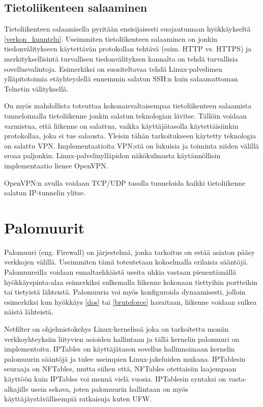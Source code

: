 \subsection{Tietoliikenteen salaaminen}\label{tietoliikenteen_salaaminen}

Tietoliikenteen salaamisella pyritään ensisijaisesti suojautumaan hyökkäykseltä \ref{verkon_kuuntelu}. Useimmiten tietoliikenteen salaaminen on jonkin tiedonvälitykseen käytettävän protokollan tehtävä (esim. HTTP vs. HTTPS) ja merkityksellisintä turvallisen tiedonvälityksen kannalta on tehdä turvallisia sovellusvalintoja. Esimerkiksi on suositeltavaa tehdä Linux-palvelimen ylläpitotoimia etäyhteydellä ennemmin salatun SSH:n kuin salaamattoman Telnetin välityksellä.

On myös mahdollista toteuttaa kokonaisvaltaisempaa tietoliikenteen salaamista tunneloimalla tietoliikenne jonkin salatun teknologian lävitse. Tällöin voidaan varmistua, että liikenne on salattua, vaikka käyttäjätasolla käytettäisiinkin protokollaa, joka ei tue salausta. Yleisin tähän tarkoitukseen käytetty teknologia on salattu VPN. Implementaatioita VPN:stä on lukuisia ja toiminta niiden välillä eroaa paljonkin. Linux-palvelinylläpidon näkökulmasta käytännöllisin implementaatio lienee OpenVPN.

OpenVPN:n avulla voidaan TCP/UDP tasolla tunneloida kaikki tietoliikenne salatun IP-tunnelin ylitse.

\section{Palomuurit}\label{palomuurit}
Palomuuri (eng. Firewall) on järjestelmä, jonka tarkoitus on estää asiaton pääsy verkkojen välillä. Useimmiten tämä toteutetaan kokoelmalla erilaisia sääntöjä. Palomuureilla voidaan ennaltaehkäistä useita uhkia vastaan pienentämällä hyökkäyspinta-alaa esimerkiksi sulkemalla liikenne kokonaan tiettyihin portteihin tai tietyistä lähteistä. Palomuuria voi myös konfiguroida dynaamisesti, jolloin esimerkiksi kun hyökkäys \ref{dos} tai \ref{bruteforce} havaitaan, liikenne voidaan sulkea näistä lähteistä.

Netfilter on ohjelmistokehys Linux-kernelissä joka on tarkoitettu moniin verkkoyhteyksiin liityvien asioiden hallintaan ja tällä kernelin palomuuri on implementoitu. IPTables on käyttäjätason sovellus hallinnoimaan kernelin palomuurin sääntöjä ja tulee useimpien Linux-jakeluiden mukana. IPTablesin seuraaja on NFTables, mutta siihen että, NFTables otettaisiin laajempaan käyttöön kuin IPTables voi mennä vielä vuosia. IPTablesin syntaksi on vasta-alkajille usein sekava, joten palomuurin hallintaan on myös käyttäjäystävällisempiä ratkaisuja kuten UFW.

